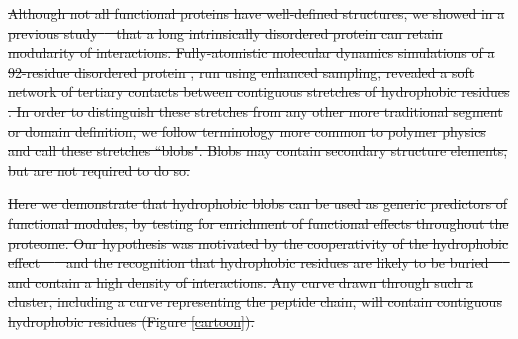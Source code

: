 \documentclass[9pt,twocolumn,twoside,lineno]{pnas-new} %
\providecommand{\DIFdel}[1]{{\protect\color{red}\sout{#1}}}                      %
\begin{document}
\DIFdel{Although not all functional proteins have well-defined structures, we showed in a previous study\mbox{%
\citep{Lohia2019} }\hspace{0pt}%
that a long intrinsically disordered protein can retain modularity of interactions. 
Fully-atomistic molecular dynamics simulations of a 92-residue disordered protein , run using enhanced sampling, revealed a soft network of tertiary contacts between contiguous stretches of hydrophobic residues .    %
In order to distinguish these stretches from any other more traditional segment or domain definition, we follow terminology more common to polymer physics and call these stretches ``blobs". Blobs may contain secondary structure elements, but are not required to do so.%
}%

\DIFdel{Here we demonstrate that hydrophobic blobs can be used as generic predictors of functional modules, by testing for enrichment of functional effects throughout the proteome. %
Our hypothesis was motivated by the cooperativity of the hydrophobic effect~\mbox{%
\citep{Jiang2017} }\hspace{0pt}%
and the recognition that hydrophobic residues are likely to be buried~\mbox{%
\citep{Lins2003} }\hspace{0pt}%
and contain a high density of interactions. Any curve drawn through such a cluster, including a curve representing the peptide chain, will contain contiguous hydrophobic residues (Figure \ref{cartoon}).  }%
\end{document}
